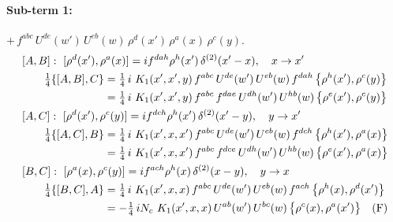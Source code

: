 \documentclass[10pt]{article}
\numberwithin{equation}{section}
\begin{document}
\paragraph{Sub-term 1:} $+\,f^{abc}\,U^{de}(w')\,U^{eb}(w)\,\rho^{d}(x')\,\rho^{a}(x)\,\rho^{c}(y)$.
\begin{align}
&[A,B]:\ [\rho^{d}(x'),\rho^{a}(x)]=i f^{dah}\rho^{h}(x')\,\delta^{(2)}(x'-x),\quad x\to x'\notag\\
&\qquad \tfrac14\{[A,B],C\}=\tfrac14\,i\,\,K_1(x',x',y)\,f^{abc}\,U^{de}(w')\,U^{eb}(w)\,f^{dah}\,\big\{\rho^{h}(x'),\rho^{c}(y)\big\}\notag\\
&\qquad\phantom{\tfrac14\{[A,B],C\}}=\tfrac14\,i\,\,K_1(x',x',y)\,f^{abc}\,f^{dae}\,U^{dh}(w')\,U^{hb}(w)\,\big\{\rho^{e}(x'),\rho^{c}(y)\big\}
\label{R:eq:A1-1-AB}\\
&[A,C]:\ [\rho^{d}(x'),\rho^{c}(y)]=i f^{dch}\rho^{h}(x')\,\delta^{(2)}(x'-y),\quad y\to x'\notag\\
&\qquad \tfrac14\{[A,C],B\}=\tfrac14\,i\,\,K_1(x',x,x')\,f^{abc}\,U^{de}(w')\,U^{eb}(w)\,f^{dch}\,\big\{\rho^{h}(x'),\rho^{a}(x)\big\}\notag\\
&\qquad\phantom{\tfrac14\{[A,C],B\}}=\tfrac14\,i\,\,K_1(x',x,x')\,f^{abc}\,f^{dce}\,U^{dh}(w')\,U^{hb}(w)\,\big\{\rho^{e}(x'),\rho^{a}(x)\big\}
\label{R:eq:A1-1-AC}\\
&[B,C]:\ [\rho^{a}(x),\rho^{c}(y)]=i f^{ach}\rho^{h}(x)\,\delta^{(2)}(x-y),\quad y\to x\notag\\
&\qquad \tfrac14\{[B,C],A\}=\tfrac14\,i\,\,K_1(x',x,x)\,f^{abc}\,U^{de}(w')\,U^{eb}(w)\,f^{ach}\,\big\{\rho^{h}(x),\rho^{d}(x')\big\}\notag\\
&\qquad\phantom{\tfrac14\{[B,C],A\}}=-\tfrac14\,i N_{c}\,\,K_1(x',x,x)\,U^{ab}(w')\,U^{bc}(w)\,\big\{\rho^{c}(x),\rho^{a}(x')\big\}\quad\text{(F)}
\label{R:eq:A1-1-BC}
\end{align}
\end{document}
